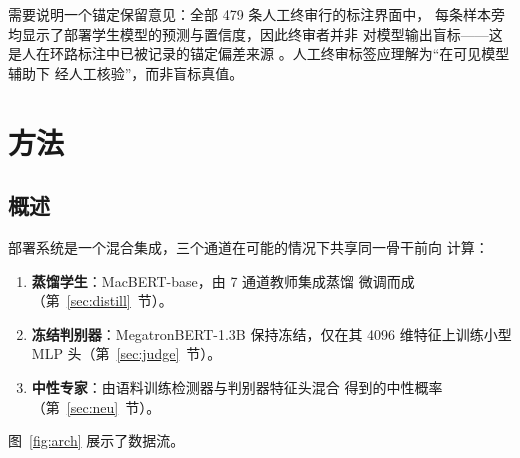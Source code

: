 \documentclass[11pt,a4paper]{article}
\begin{document}
需要说明一个锚定保留意见：全部 479 条人工终审行的标注界面中，
每条样本旁均显示了部署学生模型的预测与置信度，因此终审者并非
对模型输出盲标——这是人在环路标注中已被记录的锚定偏差来源
\citep{schroeder2025}。人工终审标签应理解为“在可见模型辅助下
经人工核验”，而非盲标真值。

\section{方法}
\label{sec:method}

\subsection{概述}

部署系统是一个混合集成，三个通道在可能的情况下共享同一骨干前向
计算：

\begin{enumerate}
  \item \textbf{蒸馏学生}：MacBERT-base，由 7 通道教师集成蒸馏
        微调而成（第~\ref{sec:distill}~节）。
  \item \textbf{冻结判别器}：MegatronBERT-1.3B 保持冻结，仅在其
        4096 维特征上训练小型 MLP 头（第~\ref{sec:judge}~节）。
  \item \textbf{中性专家}：由语料训练检测器与判别器特征头混合
        得到的中性概率（第~\ref{sec:neu}~节）。
\end{enumerate}

图~\ref{fig:arch} 展示了数据流。
\end{document}
